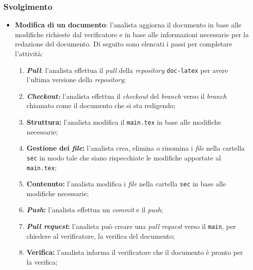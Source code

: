 \subsubsection{Svolgimento}
\begin{itemize}
	\item \textbf{Modifica di un documento}: l'analista aggiorna il documento in
	      base alle modifiche richieste dal verificatore e in base alle
	      informazioni necessarie per la redazione del documento. Di seguito sono
	      elencati i passi per completare l'attività:
	      \begin{enumerate}
		      \item \textbf{\textit{Pull}}: l'analista effettua il \textit{pull}
		            della \textit{repository} \texttt{doc-latex} per avere
		            l'ultima versione della \textit{repository};

		      \item \textbf{\textit{Checkout:}} l'analista effettua il
		            \textit{checkout} del \textit{branch} verso il
		            \textit{branch} chiamato come il documento che si sta
		            redigendo;

		      \item \textbf{Struttura:} l'analista modifica il
		            \texttt{main.tex} in base alle modifiche necessarie;

		      \item \textbf{Gestione dei \textit{file}:} l'analista crea,
		            elimina o rinomina i \textit{file} nella cartella
		            \texttt{sec} in modo tale che siano rispecchiate le
		            modifiche apportate al \texttt{main.tex};

		      \item \textbf{Contenuto:} l'analista modifica i \textit{file}
		            nella cartella \texttt{sec} in base alle modifiche
		            necessarie;

		      \item \textbf{\textit{Push}:} l'analista effettua un
		            \textit{commit} e il \textit{push};

		      \item \textbf{\textit{Pull request}:} l'analista può creare
		            una \textit{pull request} verso il \texttt{main},
		            per chiedere al verificatore, la verifica del documento;

		      \item \textbf{Verifica:} l'analista informa il verificatore
		            che il documento è pronto per la verifica;


\end{enumerate}
\end{itemize}
